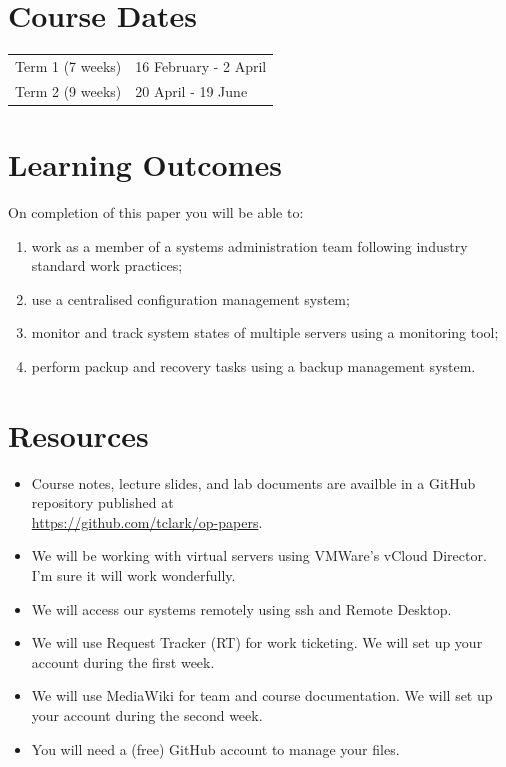 \documentclass{article}
\begin{document}
\section*{Course Dates}
\begin{tabular}{ll}
Term 1 (7 weeks) & 16 February - 2 April\\
Term 2 (9 weeks) & 20 April - 19 June\\
\end{tabular}

\newpage 

\section*{Learning Outcomes}
On completion of this paper you will be able to:
\begin{enumerate}
  \item work as a member of a systems administration team following industry standard work practices;
  \item use a centralised configuration management system;
  \item monitor and track system states of multiple servers using a monitoring tool;
  \item perform packup and recovery tasks using a backup management system.
\end{enumerate}

\section*{Resources}
\begin{itemize}
	\item Course notes, lecture slides, and lab documents are availble in a GitHub repository published at \\ \url{https://github.com/tclark/op-papers}.
	\item We will be working with virtual servers using VMWare's vCloud Director. I'm sure it will work wonderfully.
	\item We will access our systems remotely using ssh and Remote Desktop.
	\item We will use Request Tracker (RT) for work ticketing. We will set up your account during the first week.
	\item We will use MediaWiki for team and course documentation. We will set up your account during the second week.
	\item You will need a (free) GitHub account to manage your files.
\end{itemize}
\end{document}
